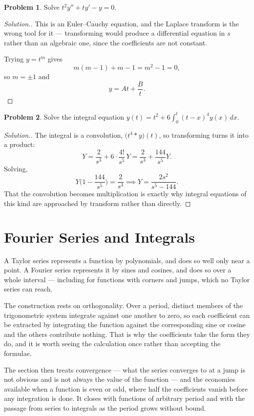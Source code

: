\documentclass[11pt,a4paper]{article}
\theoremstyle{definition}
\newtheorem{problemx}{Problem}[subsection]
\newenvironment{problem}{\begin{problemx}}{\end{problemx}}
\newenvironment{solution}
  {\renewcommand{\qedsymbol}{}\begin{proof}[\textit{Solution}.]}
  {\end{proof}}
\begin{document}
\begin{problem}
Solve $t^2y''+ty'-y = 0$.
\end{problem}
\begin{solution}
This is an Euler--Cauchy equation, and the Laplace transform is the wrong tool
for it --- transforming would produce a differential equation in $s$ rather than
an algebraic one, since the coefficients are not constant.

Trying $y = t^m$ gives
$$m(m-1) + m - 1 = m^2-1 = 0 ,$$
so $m = \pm 1$ and
$$y = At + \frac{B}{t}.$$
\end{solution}

\begin{problem}
Solve the integral equation
$\displaystyle{y(t) = t^2 + 6\int_0^t(t-x)^4y(x)\,dx}$.
\end{problem}
\begin{solution}
The integral is a convolution, $\big(t^4 * y\big)(t)$, so transforming turns it
into a product:
$$Y = \frac{2}{s^3} + 6\cdot\frac{4!}{s^5}\,Y
= \frac{2}{s^3} + \frac{144}{s^5}Y .$$
Solving,
$$Y\Big(1-\frac{144}{s^5}\Big) = \frac{2}{s^3}
\implies Y = \frac{2s^2}{s^5-144}.$$
That the convolution becomes multiplication is exactly why integral equations of
this kind are approached by transform rather than directly.
\end{solution}



\pagebreak
{\color[wave]{485}\section{Fourier Series and Integrals}}

A Taylor series represents a function by polynomials, and does so well only near
a point. A Fourier series represents it by sines and cosines, and does so over a
whole interval --- including for functions with corners and jumps, which no
Taylor series can reach.

The construction rests on orthogonality. Over a period, distinct members of the
trigonometric system integrate against one another to zero, so each coefficient
can be extracted by integrating the function against the corresponding sine or
cosine and the others contribute nothing. That is why the coefficients take the
form they do, and it is worth seeing the calculation once rather than accepting
the formulae.

The section then treats convergence --- what the series converges to at a jump is
not obvious and is not always the value of the function --- and the economies
available when a function is even or odd, where half the coefficients vanish
before any integration is done. It closes with functions of arbitrary period and
with the passage from series to integrals as the period grows without bound.
\end{document}
